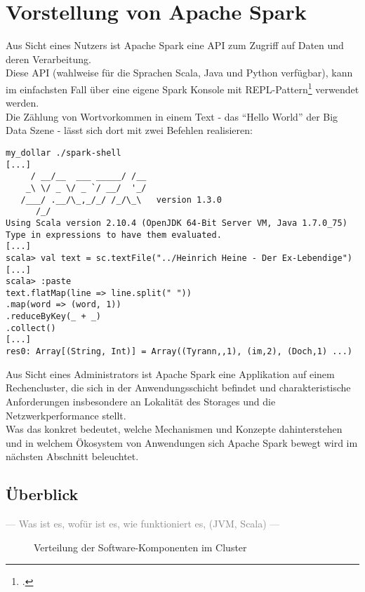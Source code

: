 \chapter{Vorstellung von Apache Spark}
Aus Sicht eines Nutzers ist Apache Spark eine API zum Zugriff auf Daten und deren Verarbeitung.\\

Diese API (wahlweise für die Sprachen Scala, Java und Python verfügbar), kann im einfachsten Fall über eine eigene Spark Konsole mit REPL-Pattern\footcite{Hail} verwendet werden.\\
Die Zählung von Wortvorkommen in einem Text - das "`Hello World"' der Big Data Szene - lässt sich dort mit zwei Befehlen realisieren:\\

\begin{lstlisting}[caption=Word Count in der Spark Konsole]
my_dollar ./spark-shell
[...]
     / __/__  ___ _____/ /__
    _\ \/ _ \/ _ `/ __/  '_/
   /___/ .__/\_,_/_/ /_/\_\   version 1.3.0
      /_/
Using Scala version 2.10.4 (OpenJDK 64-Bit Server VM, Java 1.7.0_75)
Type in expressions to have them evaluated.
[...]
scala> val text = sc.textFile("../Heinrich Heine - Der Ex-Lebendige")
[...]
scala> :paste
text.flatMap(line => line.split(" "))
.map(word => (word, 1))
.reduceByKey(_ + _)
.collect()
[...]
res0: Array[(String, Int)] = Array((Tyrann,,1), (im,2), (Doch,1) ...)

\end{lstlisting}


Aus Sicht eines Administrators ist Apache Spark eine Applikation auf einem Rechencluster, die sich in der Anwendungsschicht befindet und charakteristische Anforderungen insbesondere an Lokalität des Storages und die Netzwerkperformance stellt.\\

Was das konkret bedeutet, welche Mechanismen und Konzepte dahinterstehen und in welchem Ökosystem von Anwendungen sich Apache Spark bewegt wird im nächsten Abschnitt beleuchtet.

\section{Überblick}
\textcolor{gray}{--- Was ist es, wofür ist es, wie funktioniert es, (JVM, Scala) ---}

\begin{figure}[h]
\centering
  \caption{Verteilung der Software-Komponenten im Cluster}
\end{figure}
